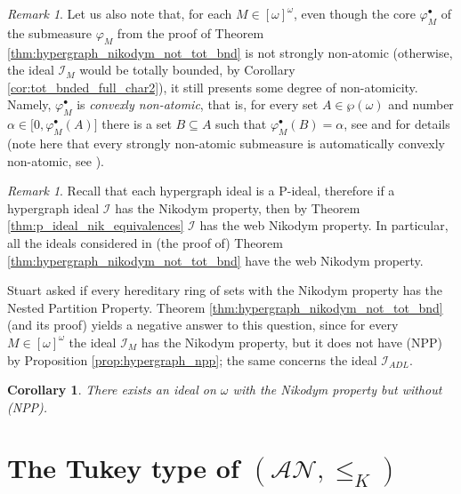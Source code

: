 \documentclass[a4paper,11pt,fleqn]{amsart}
\newtheorem{corollary}[theorem]{Corollary}
\theoremstyle{definition}
\theoremstyle{remark}
\newtheorem{remark}[theorem]{Remark}
\numberwithin{equation}{section}
\newcommand{\N}{\mathbb{N}}
\newcommand{\aA}{\mathcal{A}}
\newcommand{\iI}{\mathcal{I}}
\newcommand{\nN}{\mathcal{N}}
\newcommand{\sub}{\subseteq}
\newcommand{\ctblsub}[1]{\left[#1\right]^\omega}
\newcommand{\wo}{{\wp(\omega)}}%
\newcommand{\cso}{\ctblsub{\omega}}%
\begin{document}
\begin{remark}
    Let us also note that, for each $M\in\cso$, even though the core $\varphi^\bullet_M$ of the submeasure $\varphi_M$  from the proof of Theorem \ref{thm:hypergraph_nikodym_not_tot_bnd} is not strongly non-atomic (otherwise, the ideal $\iI_M$ would be totally bounded, by Corollary \ref{cor:tot_bnded_full_char2}), it still presents some degree of non-atomicity. Namely, $\varphi_M^\bullet$ is \textit{convexly non-atomic}, that is, for every set $A\in\wo$ and number $\alpha\in\big[0,\varphi_M^\bullet(A)\big]$ there is a set $B\sub A$ such that $\varphi_M^\bullet(B)=\alpha$, see \cite[Proposition 5.2 and Theorem 6.2]{DP00} and \cite[Section 3]{BL13} for details (note here that every strongly non-atomic submeasure is automatically convexly non-atomic, see \cite[page 494]{DP00}).
\end{remark}

\begin{remark}\label{rem:hypergraph_web_nikodym}
Recall that each hypergraph ideal is a P-ideal, therefore if a hypergraph ideal $\iI$ has the Nikodym property, then by Theorem \ref{thm:p_ideal_nik_equivalences} $\iI$ has the web Nikodym property. In particular, all the ideals considered in (the proof of) Theorem \ref{thm:hypergraph_nikodym_not_tot_bnd} have the web Nikodym property.
\end{remark}

Stuart \cite[page 153]{Stu07} asked if every hereditary ring of sets with the Nikodym property has the Nested Partition Property. Theorem \ref{thm:hypergraph_nikodym_not_tot_bnd} (and its proof) yields a negative answer to this question, since for every $M\in\cso$ the ideal $\iI_M$ has the Nikodym property, but it does not have (NPP) by Proposition \ref{prop:hypergraph_npp}; the same concerns the ideal $\iI_{ADL}$.

\begin{corollary}\label{cor:nikodym_no_npp}
    There exists an ideal on $\omega$ with the Nikodym property but without (NPP).
\end{corollary}

\section{The Tukey type of $(\aA\nN,\le_K)$\label{sec:tukey}}
\end{document}
